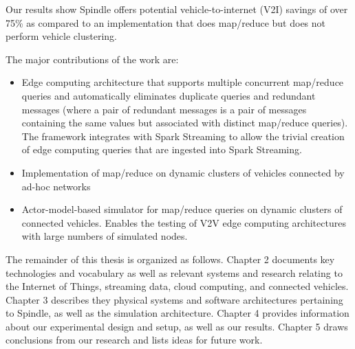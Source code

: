 \documentclass{thesis}
\begin{document}

    Our results show Spindle offers potential vehicle-to-internet (V2I) savings of over 75\% as
    compared to an implementation that does map/reduce but does not perform vehicle clustering.  

    The major contributions of the work are:
        \begin{itemize}
            \item Edge computing architecture that supports multiple concurrent map/reduce queries
                and automatically eliminates duplicate queries and redundant messages (where a pair of
                redundant messages is a pair of messages containing the same values but associated with
                distinct map/reduce queries). The framework integrates with Spark Streaming to allow
                the trivial creation of edge computing queries that are ingested into Spark Streaming.
            \item Implementation of map/reduce on dynamic clusters of vehicles connected by ad-hoc networks
            \item Actor-model-based simulator for map/reduce queries on dynamic clusters of connected vehicles.
                Enables the testing of V2V edge computing architectures with large numbers of simulated
                nodes.
        \end{itemize}

    The remainder of this thesis is organized as follows.
    Chapter 2 documents key technologies and vocabulary as well as relevant systems and research relating
    to the Internet of Things, streaming data, cloud computing, and connected vehicles. Chapter 3
    describes they physical systems and software architectures pertaining to Spindle, as well as the
    simulation architecture. Chapter 4 provides information about our experimental design and setup,
    as well as our results. Chapter 5 draws conclusions from our research and lists ideas for future
    work.
\end{document}

